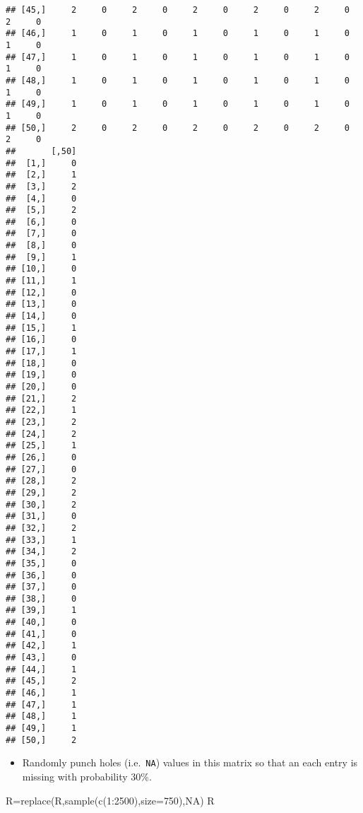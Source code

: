 \documentclass[
]{article}
\newenvironment{Shaded}{\begin{snugshade}}{\end{snugshade}}
\newcommand{\AttributeTok}[1]{\textcolor[rgb]{0.77,0.63,0.00}{#1}}
\newcommand{\ConstantTok}[1]{\textcolor[rgb]{0.00,0.00,0.00}{#1}}
\newcommand{\DecValTok}[1]{\textcolor[rgb]{0.00,0.00,0.81}{#1}}
\newcommand{\FunctionTok}[1]{\textcolor[rgb]{0.00,0.00,0.00}{#1}}
\newcommand{\NormalTok}[1]{#1}
\newcommand{\OtherTok}[1]{\textcolor[rgb]{0.56,0.35,0.01}{#1}}
\newcommand{\SpecialCharTok}[1]{\textcolor[rgb]{0.00,0.00,0.00}{#1}}
\providecommand{\tightlist}{%
  \setlength{\itemsep}{0pt}\setlength{\parskip}{0pt}}
\begin{document}
\begin{verbatim}
## [45,]     2     0     2     0     2     0     2     0     2     0     2     0
## [46,]     1     0     1     0     1     0     1     0     1     0     1     0
## [47,]     1     0     1     0     1     0     1     0     1     0     1     0
## [48,]     1     0     1     0     1     0     1     0     1     0     1     0
## [49,]     1     0     1     0     1     0     1     0     1     0     1     0
## [50,]     2     0     2     0     2     0     2     0     2     0     2     0
##       [,50]
##  [1,]     0
##  [2,]     1
##  [3,]     2
##  [4,]     0
##  [5,]     2
##  [6,]     0
##  [7,]     0
##  [8,]     0
##  [9,]     1
## [10,]     0
## [11,]     1
## [12,]     0
## [13,]     0
## [14,]     0
## [15,]     1
## [16,]     0
## [17,]     1
## [18,]     0
## [19,]     0
## [20,]     0
## [21,]     2
## [22,]     1
## [23,]     2
## [24,]     2
## [25,]     1
## [26,]     0
## [27,]     0
## [28,]     2
## [29,]     2
## [30,]     2
## [31,]     0
## [32,]     2
## [33,]     1
## [34,]     2
## [35,]     0
## [36,]     0
## [37,]     0
## [38,]     0
## [39,]     1
## [40,]     0
## [41,]     0
## [42,]     1
## [43,]     0
## [44,]     1
## [45,]     2
## [46,]     1
## [47,]     1
## [48,]     1
## [49,]     1
## [50,]     2
\end{verbatim}

\begin{itemize}
\tightlist
\item
  Randomly punch holes (i.e.~\texttt{NA}) values in this matrix so that
  an each entry is missing with probability 30\%.
\end{itemize}

\begin{Shaded}
\begin{Highlighting}[]
\NormalTok{R}\OtherTok{=}\FunctionTok{replace}\NormalTok{(R,}\FunctionTok{sample}\NormalTok{(}\FunctionTok{c}\NormalTok{(}\DecValTok{1}\SpecialCharTok{:}\DecValTok{2500}\NormalTok{),}\AttributeTok{size=}\DecValTok{750}\NormalTok{),}\ConstantTok{NA}\NormalTok{)}
\NormalTok{R}
\end{Highlighting}
\end{Shaded}
\end{document}

